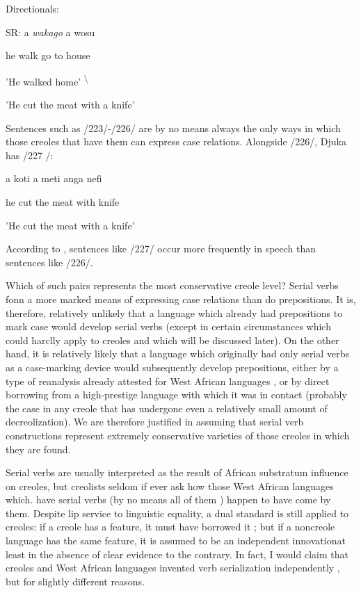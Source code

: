 \ea\label{ex:223}
 Directionals:
\glt
\z

SR: a \textit{wak}\textit{a}\textit{go} a wosu

he walk go to house

'He walked home' \textsuperscript{{\textbackslash}}

'He cut the meat with a knife'

Sentences such as /223/-/226/ are by no means always the only ways in which those creoles that have them can express case relations. Alongside /226/, Djuka has /227 /:

\ea\label{ex:227}
 a koti a meti anga nefi
\glt
\z

he cut the meat with knife

'He cut the meat with a knife'

According to \citet{Huttar1975}, sentences like /227/ occur more fre\-quently in speech than sentences like /226/.

Which of such pairs represents the most conservative creole
level? Serial verbs fonn a more marked means of expressing case rela\-tions than do prepositions. It is, therefore, relatively unlikely that a language which already had prepositions to mark case would develop serial verbs (except in certain circumstances which could harclly apply
to creoles and which will be discussed later). On the other hand, it is
relatively likely that a language which originally had only serial verbs as a case-marking device would subsequently develop prepositions, either by a type of reanalysis already attested for West African lan\-guages \citep{Lord1976}, or by direct borrowing from a high-prestige lan\-guage with which it was in contact (probably the case in any creole
that has undergone even a relatively small amount of decreolization). We are therefore justified in assuming that serial verb constructions represent extremely conservative varieties of those creoles in which they are found.

Serial verbs are usually interpreted as the result of African substratum influence on creoles, but creolists seldom if ever ask how those West African languages which. have serial verbs (by no means all of them ) happen to have come by them. Despite lip service to linguistic equality, a dual standard is still applied to creoles: if a creole has a feature, it must have borrowed it ; but if a noncreole language has the same feature, it is assumed to be an independent innovation\-at least in the absence of clear evidence to the contrary. In fact, I would claim that creoles and West African languages invented verb serialization independently , but for slightly different reasons.

